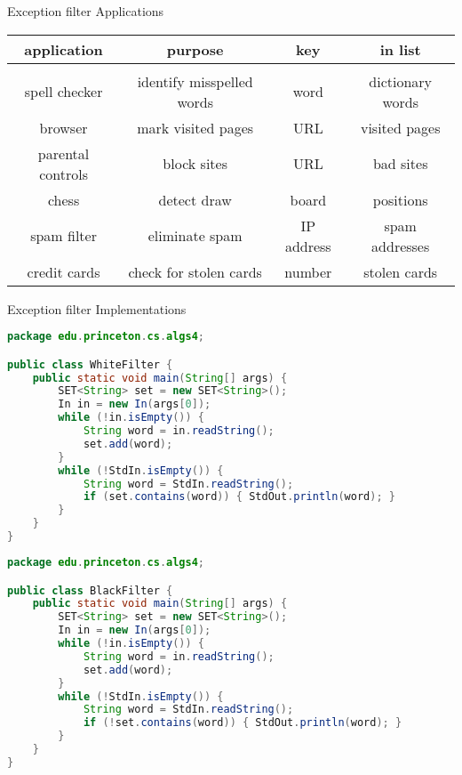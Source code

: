 \documentclass[8pt,a4paper,compress]{beamer}
\begin{document}
\begin{frame}[fragile]
Exception filter Applications
\begin{center}
\begin{tabular}{cccc}
application & purpose & key & in list \\ \hline \\
spell checker & identify misspelled words & word & dictionary words \\
browser & mark visited pages & URL & visited pages \\
parental controls & block sites & URL & bad sites \\
chess & detect draw & board & positions \\
spam filter & eliminate spam  & IP address & spam addresses \\
credit cards & check for stolen cards & number & stolen cards
\end{tabular} 
\end{center}
\end{frame}

\begin{frame}[fragile]
Exception filter Implementations
\begin{lstlisting}[language=Java]
package edu.princeton.cs.algs4;

public class WhiteFilter {  
    public static void main(String[] args) {
        SET<String> set = new SET<String>();
        In in = new In(args[0]);
        while (!in.isEmpty()) {
            String word = in.readString();
            set.add(word);
        }
        while (!StdIn.isEmpty()) {
            String word = StdIn.readString();
            if (set.contains(word)) { StdOut.println(word); }
        }
    }
}
\end{lstlisting}

\begin{lstlisting}[language=Java]
package edu.princeton.cs.algs4;

public class BlackFilter {  
    public static void main(String[] args) {
        SET<String> set = new SET<String>();
        In in = new In(args[0]);
        while (!in.isEmpty()) {
            String word = in.readString();
            set.add(word);
        }
        while (!StdIn.isEmpty()) {
            String word = StdIn.readString();
            if (!set.contains(word)) { StdOut.println(word); }
        }
    }
}
\end{lstlisting}
\end{frame}
\end{document}
